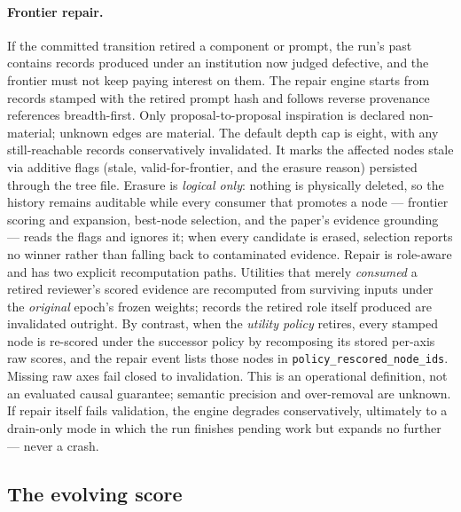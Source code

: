 \paragraph{Frontier repair.}
If the committed transition retired a component or prompt, the run's
past contains records produced under an institution now judged
defective, and the frontier must not keep paying interest on them.
The repair engine starts from records stamped with the retired prompt hash
and follows reverse provenance references breadth-first. Only
proposal-to-proposal inspiration is declared non-material; unknown edges
are material. The default depth cap is eight, with any still-reachable
records conservatively invalidated. It marks
the affected nodes stale via additive flags (stale, valid-for-frontier,
and the erasure reason) persisted through the tree file. Erasure is
\emph{logical only}: nothing is physically deleted, so the history
remains auditable while every consumer that promotes a node ---
frontier scoring and expansion, best-node selection, and the paper's
evidence grounding --- reads the flags and ignores it; when every
candidate is erased, selection reports no winner rather than falling
back to contaminated evidence. Repair is
role-aware and has two explicit recomputation paths. Utilities that
merely \emph{consumed} a retired reviewer's scored evidence are
recomputed from surviving inputs under the \emph{original} epoch's
frozen weights; records the retired role itself produced are
invalidated outright. By contrast, when the \emph{utility policy}
retires, every stamped node is re-scored under the successor policy
by recomposing its stored per-axis raw scores, and the repair event
lists those nodes in \texttt{policy\_rescored\_node\_ids}. Missing
raw axes fail closed to invalidation. This is an operational definition,
not an evaluated causal guarantee; semantic precision and over-removal
are unknown. If repair itself fails validation, the engine
degrades conservatively, ultimately to a drain-only mode in which the
run finishes pending work but expands no further --- never a crash.

\subsection{The evolving score}\label{sec:rqgm:utility}

